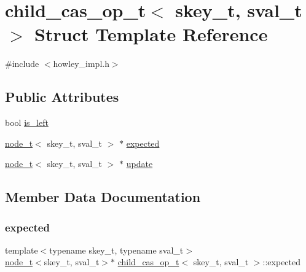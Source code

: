 \hypertarget{structchild__cas__op__t}{}\section{child\+\_\+cas\+\_\+op\+\_\+t$<$ skey\+\_\+t, sval\+\_\+t $>$ Struct Template Reference}
\label{structchild__cas__op__t}


{\ttfamily \#include $<$howley\+\_\+impl.\+h$>$}

\subsection*{Public Attributes}
\begin{DoxyCompactItemize}
\item 
bool \hyperlink{structchild__cas__op__t_af87cba76e81715b0c5bbcc22c9c75ac0}{is\+\_\+left}
\item 
\hyperlink{structnode__t}{node\+\_\+t}$<$ skey\+\_\+t, sval\+\_\+t $>$ $\ast$ \hyperlink{structchild__cas__op__t_a8bf7ff715dfc538d9bfcb587c10f06e0}{expected}
\item 
\hyperlink{structnode__t}{node\+\_\+t}$<$ skey\+\_\+t, sval\+\_\+t $>$ $\ast$ \hyperlink{structchild__cas__op__t_a5e4b9e71b9c923eb44db92dd1fb799c8}{update}
\end{DoxyCompactItemize}


\subsection{Member Data Documentation}
\mbox{\label{structchild__cas__op__t_a8bf7ff715dfc538d9bfcb587c10f06e0}} 
\subsubsection{\texorpdfstring{expected}{expected}}
{\footnotesize\ttfamily template$<$typename skey\+\_\+t, typename sval\+\_\+t$>$ \\
\hyperlink{structnode__t}{node\+\_\+t}$<$skey\+\_\+t, sval\+\_\+t$>$$\ast$ \hyperlink{structchild__cas__op__t}{child\+\_\+cas\+\_\+op\+\_\+t}$<$ skey\+\_\+t, sval\+\_\+t $>$\+::expected}

\mbox{\label{structchild__cas__op__t_af87cba76e81715b0c5bbcc22c9c75ac0}} 
